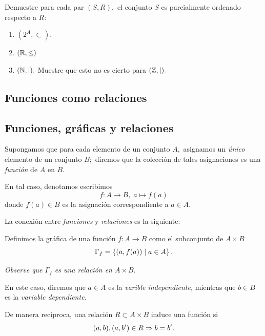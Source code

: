 	\begin{problema}
		\label{lip:exmp:2.14}
		Demuestre para cada par $(S,R),$ el conjunto $S$ es parcialmente ordenado respecto a $R:$
		\begin{enumerate}%
			\item $(2^{A}, \subset).$ %
			
			\item $(\mathbb{R}, \leq )$
			\item $(\mathbb{N}, \mid).$  Muestre que esto no es cierto para $(\mathbb{Z}, \mid).$
		\end{enumerate}
		
	\end{problema}
	


\subsection{Funciones como relaciones}

\subsection{Funciones, gráficas y relaciones}

	Supongamos que para cada elemento de un conjunto $A,$ asignamos un \emph{único} elemento de un conjunto $B;$ diremos que la colección de tales asignaciones es una \emph{función} de $A$ en $B.$ 
	
	
	En tal caso, denotamos escribimos 
	$$f:A\to B, \; a \mapsto f(a)$$
	donde $f(a)\in B$ es la asignación correspondiente a $a\in A.$



	La conexión entre \emph{funciones} y \emph{relaciones} es la siguiente:
	
	
	Definimos la gráfica de una función $f:A\to B$ como el subconjunto de $A \times B$
	$$
	\Gamma_{f}=\left\{ (a, f(a)) \mid a \in A \right\}.
	$$
	
	
	\emph{Observe que $\Gamma_{f}$ es una relación en $A\times B.$}
	
	En este caso, diremos que $a\in A$ es la \emph{varible independiente,} mientras que $b\in B$ es la \emph{variable dependiente.}



	De manera reciproca, una relación $R\subset A \times B$ induce una función si 
	$$
	(a,b), (a,b')\in R \Rightarrow b=b'.
	$$
	
